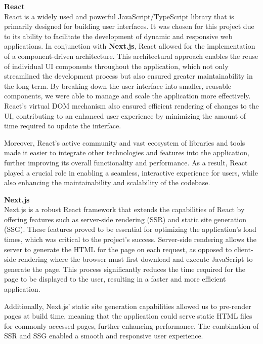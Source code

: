 \textbf{React} \\
React is a widely used and powerful JavaScript/TypeScript library that is
primarily designed for building user interfaces. It was chosen for this
project due to its ability to facilitate the development of dynamic and
responsive web applications. In conjunction with \textbf{Next.js}, React
allowed for the implementation of a component{-}driven architecture. This
architectural approach enables the reuse of individual UI components
throughout the application, which not only streamlined the development
process but also ensured greater maintainability in the long term. By
breaking down the user interface into smaller, reusable components, we were
able to manage and scale the application more effectively. React's virtual
DOM mechanism also ensured efficient rendering of changes to the UI,
contributing to an enhanced user experience by minimizing the amount of
time required to update the interface.

Moreover, React's active community and vast ecosystem of libraries and tools
made it easier to integrate other technologies and features into the
application, further improving its overall functionality and performance. As
a result, React played a crucial role in enabling a seamless, interactive
experience for users, while also enhancing the maintainability and
scalability of the codebase.

\vspace{0.5cm}

\textbf{Next.js} \\
Next.js is a robust React framework that extends the capabilities of React
by offering features such as server{-}side rendering (SSR) and static site
generation (SSG). These features proved to be essential for optimizing the
application's load times, which was critical to the project's success.
Server{-}side rendering allows the server to generate the HTML for the page
on each request, as opposed to client{-}side rendering where the browser
must first download and execute JavaScript to generate the page. This
process significantly reduces the time required for the page to be displayed
to the user, resulting in a faster and more efficient application.

Additionally, Next.js' static site generation capabilities allowed us to
pre{-}render pages at build time, meaning that the application could serve
static HTML files for commonly accessed pages, further enhancing
performance. The combination of SSR and SSG enabled a smooth and responsive
user experience.

